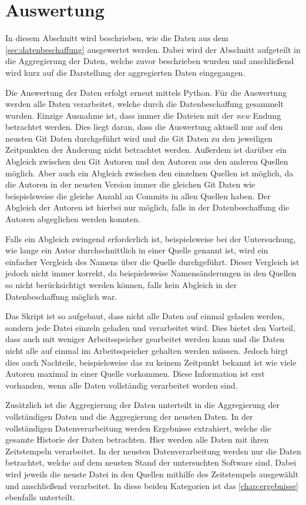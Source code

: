 \section{Auswertung}
\label{sec:auswertung}
In diesem Abschnitt wird beschrieben, wie die Daten aus dem \autoref{sec:datenbeschaffung} ausgewertet werden.
Dabei wird der Abschnitt aufgeteilt in die Aggregierung der Daten, welche zuvor beschrieben wurden und anschließend wird kurz auf die Darstellung der aggregierten Daten eingegangen.

Die Auswertung der Daten erfolgt erneut mittels Python.
Für die Auswertung werden alle Daten verarbeitet, welche durch die Datenbeschaffung gesammelt wurden.
Einzige Ausnahme ist, dass immer die Dateien mit der \emph{new} Endung betrachtet werden.
Dies liegt daran, dass die Auswertung aktuell nur auf den neusten Git Daten durchgeführt wird und die Git Daten zu den jeweiligen Zeitpunkten der Änderung nicht betrachtet werden.
Außerdem ist darüber ein Abgleich zwischen den Git Autoren und den Autoren aus den anderen Quellen möglich.
Aber auch ein Abgleich zwischen den einzelnen Quellen ist möglich, da die Autoren in der neusten Version immer die gleichen Git Daten wie beispielsweise die gleiche Anzahl an Commits in allen Quellen haben.
Der Abgleich der Autoren ist hierbei nur möglich, falls in der Datenbeschaffung die Autoren abgeglichen werden konnten.

Falls ein Abgleich zwingend erforderlich ist, beispielsweise bei der Untersuchung, wie lange ein Autor durchschnittlich in einer Quelle genannt ist, wird ein einfacher Vergleich des Namens über die Quelle durchgeführt.
Dieser Vergleich ist jedoch nicht immer korrekt, da beispielsweise Namensänderungen in den Quellen so nicht berücksichtigt werden können, falls kein Abgleich in der Datenbeschaffung möglich war.

Das Skript ist so aufgebaut, dass nicht alle Daten auf einmal geladen werden, sondern jede Datei einzeln geladen und verarbeitet wird.
Dies bietet den Vorteil, dass auch mit weniger Arbeitsspeicher gearbeitet werden kann und die Daten nicht alle auf einmal im Arbeitsspeicher gehalten werden müssen.
Jedoch birgt dies auch Nachteile, beispielsweise das zu keinem Zeitpunkt bekannt ist wie viele Autoren maximal in einer Quelle vorkommen.
Diese Information ist erst vorhanden, wenn alle Daten vollständig verarbeitet worden sind.

Zusätzlich ist die Aggregierung der Daten unterteilt in die Aggregierung der vollständigen Daten und die Aggregierung der neusten Daten.
In der vollständigen Datenverarbeitung werden Ergebnisse extrahiert, welche die gesamte Historie der Daten betrachten.
Hier werden alle Daten mit ihren Zeitstempeln verarbeitet.
In der neusten Datenverarbeitung werden nur die Daten betrachtet, welche auf dem neusten Stand der untersuchten Software sind.
Dabei wird jeweils die neuste Datei in den Quellen mithilfe des Zeitstempels ausgewählt und anschließend verarbeitet.
In diese beiden Kategorien ist das \autoref{chap:ergebnisse} ebenfalls unterteilt.

